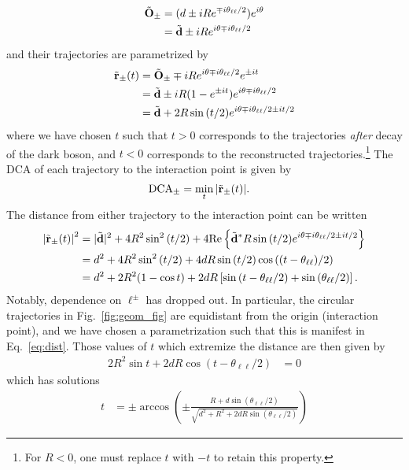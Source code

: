 \begin{align}
    \tilde{\bf O}_{\pm} &= (d \pm i R e^{\mp i\theta_{\ell\ell}/2})e^{i\theta}\nonumber \\
                        &= \tilde{\bf d} \pm i R e^{i\theta \mp i \theta_{\ell\ell}/2}
\end{align}
and their trajectories are parametrized by
\begin{align}
    \tilde{\bf r}_\pm(t) &= \tilde{\bf O}_{\pm} \mp iR e^{i\theta \mp i\theta_{\ell\ell}/2}e^{\pm it}\nonumber\\
        &= \tilde{\bf d} \pm iR(1-e^{\pm it})e^{i\theta \mp i\theta_{\ell\ell}/2}\nonumber\\
        &= \tilde{\bf d} + 2R\sin{(t/2)}e^{i\theta \mp i{\theta_{\ell\ell}/2} \pm it/2}
\end{align}
where we have chosen $t$ such that $t > 0$ corresponds to the trajectories {\it after} decay of the dark boson, and $t < 0$ corresponds to the reconstructed trajectories.\footnote{For $R < 0$, one must replace $t$ with $-t$ to retain this property.} The DCA of each trajectory to the interaction point is given by
\begin{align}
    {\rm DCA}_{\pm} &= \min_{t}{\left|\tilde{\bf r}_{\pm}(t)\right|}.
\end{align}
The distance from either trajectory to the interaction point can be written
\begin{align}
    \left|\tilde{\bf r}_{\pm}(t)\right|^2 &= |\tilde{\bf d}|^2 + 4R^2\sin^2{(t/2)} + 4{\rm Re}\left\{\tilde{\bf d}^* R \sin{(t/2)}e^{i\theta \mp i{\theta_{\ell\ell}/2} \pm it/2}\right\}\nonumber\\
    &= d^2 + 4R^2\sin^2{(t/2)} + 4dR\sin{(t/2)}\cos{((t - \theta_{\ell\ell})/2)} \nonumber\\
    &= d^2 + 2R^2(1-\cos{t}) + 2dR\left[\sin\left(t-\theta_{\ell\ell}/2\right)+ \sin{(\theta_{\ell\ell}/2)}\right].\label{eq:dist}
\end{align}
Notably, dependence on $\ell^\pm$ has dropped out. In particular, the circular trajectories in Fig.~\ref{fig:geom_fig} are equidistant from the origin (interaction point), and we have chosen a parametrization such that this is manifest in Eq.~\ref{eq:dist}. Those values of $t$ which extremize the distance are then given by
\begin{align}
    2R^2\sin{t} + 2dR\cos{(t - \theta_{\ell\ell}/2)} &= 0
\end{align}
which has solutions
\begin{align}
    t &= \pm \arccos\left(\pm \frac{R+d\sin{(\theta_{\ell\ell}/2)}}{\sqrt{d^2 + R^2 + 2dR\sin{(\theta_{\ell\ell}/2)} }}\right)
\end{align}
